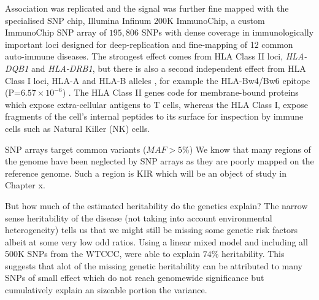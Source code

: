 
Association was replicated and the signal was further fine mapped with the specialised SNP chip, Illumina Infinum 200K ImmunoChip, a custom ImmunoChip SNP array
of $195,806$ SNPs with dense coverage in immunologically important loci designed for deep-replication and fine-mapping of 12 common auto-immune diseases.
The strongest effect comes from HLA Class II loci, \emph{HLA-DQB1} and \emph{HLA-DRB1}, but there is also a second independent effect from HLA Class I loci, HLA-A and HLA-B alleles \citep{Todd:2010bl},
for example the HLA-Bw4/Bw6 epitope (P=$6.57 \times 10^{-6}$) \citep{Nejentsev:2007dv}.
The HLA Class II genes code for membrane-bound proteins which expose extra-cellular antigens to T cells,
whereas the HLA Class I, expose fragments of the cell's internal peptides to its surface for inspection by immune cells such as Natural Killer (NK) cells.

SNP arrays target common variants ($MAF > 5\%$)
We know that many regions of the genome have been neglected by SNP arrays as they are poorly mapped on the reference genome.
Such a region is KIR which will be an object of study in Chapter x.




But how much of the estimated heritability do the genetics explain?
The narrow sense heritability of the disease (not taking into account environmental heterogeneity) tells us that we might still be missing some genetic risk factors albeit at some very low odd ratios.
Using a linear mixed model and including all 500K SNPs from the WTCCC, \citet{Speed:2012hi} were able to explain $74\%$ heritability.
This suggests that alot of the missing genetic heritability can be attributed to many SNPs of small effect which do not reach genomewide significance but cumulatively explain an sizeable portion the variance.


